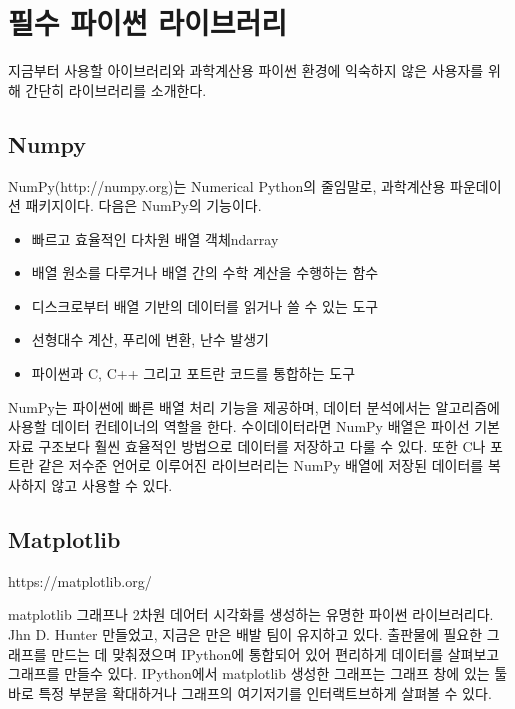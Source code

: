 
\chapter{필수 파이썬 라이브러리}

지금부터 사용할 아이브러리와 과학계산용 파이썬 환경에 익숙하지 않은 사용자를 위해 간단히 라이브러리를 소개한다.

\section{Numpy}

NumPy(http://numpy.org)는 Numerical Python의 줄임말로, 과학계산용 파운데이션 패키지이다. 다음은 NumPy의 기능이다.


\begin{itemize}
	\item{빠르고 효율적인 다차원 배열 객체ndarray}
	\item{배열 원소를 다루거나 배열 간의 수학 계산을 수행하는 함수}
	\item{디스크로부터 배열 기반의 데이터를 읽거나 쓸 수 있는 도구}
	\item{선형대수 계산, 푸리에 변환, 난수 발생기}
	\item{파이썬과 C, C++ 그리고 포트란 코드를 통합하는 도구}
\end{itemize}


NumPy는 파이썬에 빠른 배열 처리 기능을 제공하며, 데이터 분석에서는 알고리즘에 사용할 데이터 컨테이너의 역할을 한다. 수이데이터라면 NumPy 배열은 파이선 기본 자료 구조보다 훨씬 효율적인 방법으로 데이터를 저장하고 다룰 수 있다. 또한 C나 포트란 같은 저수준 언어로 이루어진 라이브러리는 NumPy 배열에 저장된 데이터를 복사하지 않고 사용할 수 있다. 


\section{Matplotlib}

https://matplotlib.org/

matplotlib \은 그래프나 2차원 데어터 시각화를 생성하는 유명한 파이썬 라이브러리다. Jhn D. Hunter \가 만들었고, 지금은 만은 배발 팀이 유지하고 있다. 출판물에 필요한 그래프를 만드는 데 맞춰졌으며 IPython에 통합되어 있어 편리하게 데이터를 살펴보고 그래프를 만들수 있다. IPython에서 matplotlib \로 생성한 그래프는 그래프 창에 있는 툴바로 특정 부분을 확대하거나 그래프의 여기저기를 인터랙트브하게 살펴볼 수 있다.



